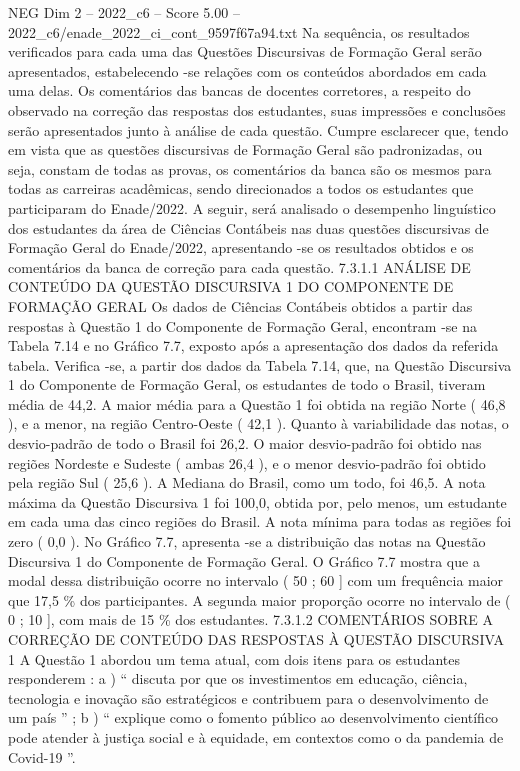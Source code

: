 \begin{textsample}{NEG Dim 2 – 2022\_c6 – Score 5.00 – 2022\_c6/enade\_2022\_ci\_cont\_9597f67a94.txt}
Na sequência, os resultados verificados para cada uma das Questões Discursivas de Formação Geral serão apresentados, estabelecendo -se relações com os conteúdos abordados em cada uma delas.
Os comentários das bancas de docentes corretores, a respeito do observado na correção das respostas dos estudantes, suas impressões e conclusões serão apresentados junto à análise de cada questão.
Cumpre esclarecer que, tendo em vista que as questões discursivas de Formação Geral são padronizadas, ou seja, constam de todas as provas, os comentários da banca são os mesmos para todas as carreiras acadêmicas, sendo direcionados a todos os estudantes que participaram do Enade/2022.
A seguir, será analisado o desempenho linguístico dos estudantes da área de Ciências Contábeis nas duas questões discursivas de Formação Geral do Enade/2022, apresentando -se os resultados obtidos e os comentários da banca de correção para cada questão. 7.3.1.1 ANÁLISE DE CONTEÚDO DA QUESTÃO DISCURSIVA 1 DO COMPONENTE DE FORMAÇÃO GERAL Os dados de Ciências Contábeis obtidos a partir das respostas à Questão 1 do Componente de Formação Geral, encontram -se na Tabela 7.14 e no Gráfico 7.7, exposto após a apresentação dos dados da referida tabela.
Verifica -se, a partir dos dados da Tabela 7.14, que, na Questão Discursiva 1 do Componente de Formação Geral, os estudantes de todo o Brasil, tiveram média de 44,2.
A maior média para a Questão 1 foi obtida na região Norte ( 46,8 ), e a menor, na região Centro-Oeste ( 42,1 ).
Quanto à variabilidade das notas, o desvio-padrão de todo o Brasil foi 26,2.
O maior desvio-padrão foi obtido nas regiões Nordeste e Sudeste ( ambas 26,4 ), e o menor desvio-padrão foi obtido pela região Sul ( 25,6 ).
A Mediana do Brasil, como um todo, foi 46,5.
A nota máxima da Questão Discursiva 1 foi 100,0, obtida por, pelo menos, um estudante em cada uma das cinco regiões do Brasil.
A nota mínima para todas as regiões foi zero ( 0,0 ).
No Gráfico 7.7, apresenta -se a distribuição das notas na Questão Discursiva 1 do Componente de Formação Geral.
O Gráfico 7.7 mostra que a modal dessa distribuição ocorre no intervalo ( 50 ; 60 ] com um frequência maior que 17,5 \% dos participantes.
A segunda maior proporção ocorre no intervalo de ( 0 ; 10 ], com mais de 15 \% dos estudantes. 7.3.1.2 COMENTÁRIOS SOBRE A CORREÇÃO DE CONTEÚDO DAS RESPOSTAS À QUESTÃO DISCURSIVA 1 A Questão 1 abordou um tema atual, com dois itens para os estudantes responderem : a ) “ discuta por que os investimentos em educação, ciência, tecnologia e inovação são estratégicos e contribuem para o desenvolvimento de um país ” ; b ) “ explique como o fomento público ao desenvolvimento científico pode atender à justiça social e à equidade, em contextos como o da pandemia de Covid-19 ”.

\end{textsample}
